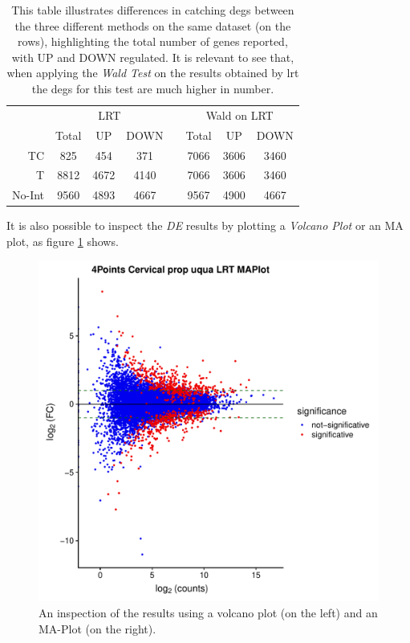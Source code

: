 \begin{table}[H]
\centering
\begin{tabular}{r c c c c c c c}
\multicolumn{1}{r}{} & \multicolumn{3}{c}{LRT} && \multicolumn{3}{c}{Wald on LRT} \\
\multicolumn{1}{r}{} & Total & UP & DOWN && Total & UP & DOWN \\
\cline{2-4}\cline{6-8}
TC & 825 & 454 & 371 && 7066 & 3606 & 3460 \\
T & 8812 & 4672 & 4140 && 7066 & 3606 & 3460 \\
No-Int & 9560 & 4893 & 4667 && 9567 & 4900 & 4667 \\
\end{tabular}
\caption[\gls{tic} DE methods results]{This table illustrates differences in catching \glspl{deg} between the three different methods on the same dataset (on the rows), highlighting the total number of genes reported, with UP and DOWN regulated. 
It is relevant to see that, when applying the \textit{Wald Test} on the results obtained by \gls{lrt} the \glspl{deg} for this test are much higher in number.}
\label{tab:ticorserderesults}
\end{table}


It is also possible to inspect the \textit{DE} results by plotting a \textit{Volcano Plot} or an MA plot, as figure \ref{fig:ticorservolcma} shows.

\begin{figure}[H]
\includegraphics[width=\textwidth, keepaspectratio]{img/ticorser/de/volcma.pdf}
\caption[ticorser Volcano-MA plots]{An inspection of the results using a volcano plot (on the left) and an MA-Plot (on the right).}
\label{fig:ticorservolcma}
\centering
\end{figure}

